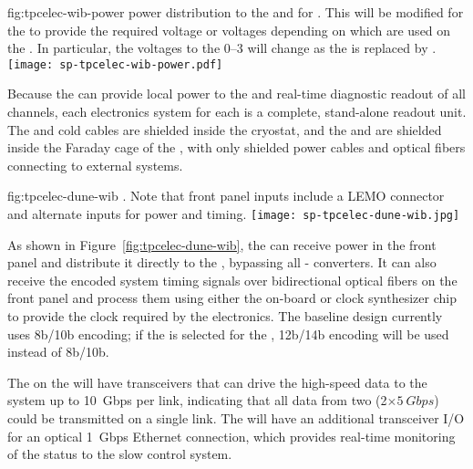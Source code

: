 \begin{dunefigure}
{fig:tpcelec-wib-power}
{ power distribution to the  and  
for  . This will be modified for the 
 to provide the required voltage or voltages 
depending on which  are used on the . 
In particular, the voltages to the  \numrange{0}{3} 
will change as the   is replaced by . }
\texttt{[image: sp-tpcelec-wib-power.pdf]}
\end{dunefigure}

Because the  can provide local power to the  
and real-time diagnostic readout of all channels, each  electronics 
system for each  is a complete, stand-alone readout unit. 
The  and cold cables are shielded inside the cryostat, 
and the  and  are shielded inside the Faraday 
cage of the , with only shielded power 
cables and optical fibers connecting to external systems.

\begin{dunefigure}
{fig:tpcelec-dune-wib}
{. Note that front panel inputs include 
a LEMO connector and alternate inputs for  power and timing.}
\texttt{[image: sp-tpcelec-dune-wib.jpg]}
\end{dunefigure}

As shown in Figure~\ref{fig:tpcelec-dune-wib}, the  can 
receive  power in the front panel and distribute it directly 
to the , bypassing all - converters.
It can also receive the encoded system timing signals over bidirectional 
optical fibers on the front panel and process them using either
the on-board  or clock synthesizer chip to provide the 
clock required by the  electronics. The baseline  design 
currently uses 8b/10b encoding; if the   
 is selected for the  , 
12b/14b encoding will be used instead of 8b/10b.

The  on the  will have transceivers that can 
drive the high-speed data to the  system up to
\SI{10}{Gbps} per link, indicating that all data from
two  (2$\times\SI{5}{Gbps}$) could be transmitted 
on a single link. The  will have an additional 
transceiver I/O for an optical \SI{1}{Gbps} Ethernet connection, which 
provides real-time monitoring of the  status to the slow control system.

